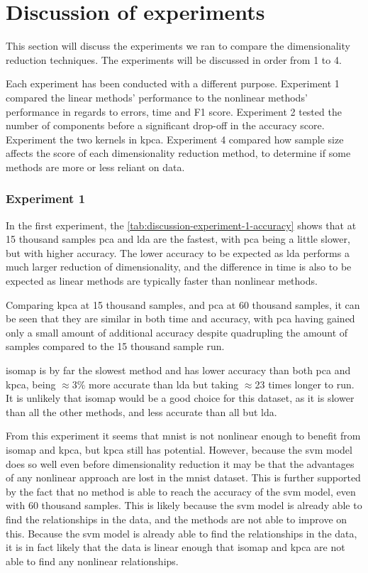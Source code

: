 \section{Discussion of experiments} \label{sec:experiments}
This section will discuss the experiments we ran to compare the dimensionality reduction techniques. The experiments will be discussed in order from 1 to 4.

Each experiment has been conducted with a different purpose. Experiment 1 compared the linear methods' performance to the nonlinear methods' performance in regards to errors, time and F1 score. Experiment 2 tested the number of components before a significant drop-off in the accuracy score. Experiment the two kernels in \gls{kpca}. Experiment 4 compared how sample size affects the score of each dimensionality reduction method, to determine if some methods are more or less reliant on data.


\subsubsection{Experiment 1}\label{subsec:experiment-1}
In the first experiment, the \autoref{tab:discussion-experiment-1-accuracy} shows that at 15 thousand samples \gls{pca} and \gls{lda} are the fastest, with \gls{pca} being a little slower, but with higher accuracy. The lower accuracy to be expected as \gls{lda} performs a much larger reduction of dimensionality, and the difference in time is also to be expected as linear methods are typically faster than nonlinear methods.

Comparing \gls{kpca} at 15 thousand samples, and \gls{pca} at 60 thousand samples, it can be seen that they are similar in both time and accuracy, with \gls{pca} having gained only a small amount of additional accuracy despite quadrupling the amount of samples compared to the 15 thousand sample run.

\gls{isomap} is by far the slowest method and has lower accuracy than both \gls{pca} and \gls{kpca}, being $\approx$3\% more accurate than \gls{lda} but taking $\approx$23 times longer to run. It is unlikely that \gls{isomap} would be a good choice for this dataset, as it is slower than all the other methods, and less accurate than all but \gls{lda}.

From this experiment it seems that \gls{mnist} is not nonlinear enough to benefit from \gls{isomap} and \gls{kpca}, but \gls{kpca} still has potential. However, because the \gls{svm} model does so well even before dimensionality reduction it may be that the advantages of any nonlinear approach are lost in the \gls{mnist} dataset. This is further supported by the fact that no method is able to reach the accuracy of the \gls{svm} model, even with 60 thousand samples. This is likely because the \gls{svm} model is already able to find the relationships in the data, and the methods are not able to improve on this. Because the \gls{svm} model is already able to find the relationships in the data, it is in fact likely that the data is linear enough that \gls{isomap} and \gls{kpca} are not able to find any nonlinear relationships.


